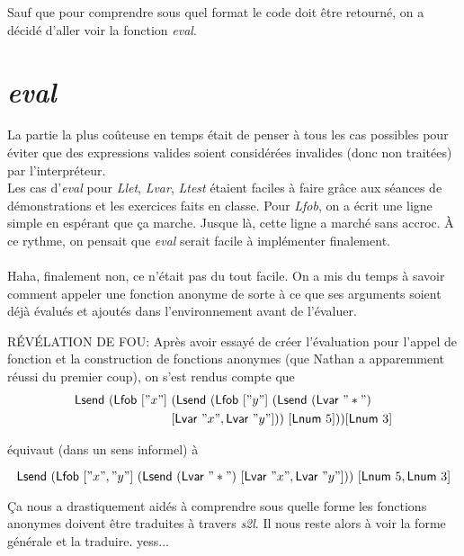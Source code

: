\documentclass{article}
\begin{document}
Sauf que pour comprendre sous quel format le code doit être retourné, on a décidé d'aller voir la fonction \textit{eval}.

\section {\textit{eval}}

La partie la plus coûteuse en temps était de penser à tous les cas possibles pour éviter que des expressions valides soient considérées invalides (donc non traitées) par l'interpréteur.\\
Les cas d'\textit{eval} pour \textit{Llet}, \textit{Lvar}, \textit{Ltest} étaient faciles à faire grâce aux séances de démonstrations et les exercices faits en classe. Pour \textit{Lfob}, on a écrit une ligne simple en espérant que ça marche. Jusque là, cette ligne a marché sans accroc. À ce rythme, on pensait que \textit{eval} serait facile à implémenter finalement.\\\\
Haha, finalement non, ce n'était pas du tout facile. On a mis du temps à savoir comment appeler une fonction anonyme de sorte à ce que ses arguments soient déjà évalués et ajoutés dans l'environnement avant de l'évaluer.

RÉVÉLATION DE FOU:
Après avoir essayé de créer l'évaluation pour l'appel de fonction et la construction de fonctions anonymes (que Nathan a apparemment réussi du premier coup), on s'est rendus compte que
\begin{displaymath}
  \begin{aligned}
    \textsf{Lsend}~(\textsf{Lfob}~["x"]~&(\textsf{Lsend}~(\textsf{Lfob}~["y"]~(\textsf{Lsend}~(\textsf{Lvar}~"*")~\\
    &[\textsf{Lvar}~"x", \textsf{Lvar}~"y"]))~[\textsf{Lnum}~5]))[\textsf{Lnum}~3]
  \end{aligned}
\end{displaymath}


équivaut (dans un sens informel) à

\begin{displaymath}
  \textsf{Lsend}~(\textsf{Lfob}~["x","y"]~(\textsf{Lsend}~(\textsf{Lvar}~"*")~[\textsf{Lvar}~"x", \textsf{Lvar}~"y"]))~[\textsf{Lnum}~5, \textsf{Lnum}~3]
\end{displaymath}

Ça nous a drastiquement aidés à comprendre sous quelle forme les fonctions anonymes doivent être traduites à travers \textit{s2l}. Il nous reste alors à voir la forme générale et la traduire. yess...
\end{document}
